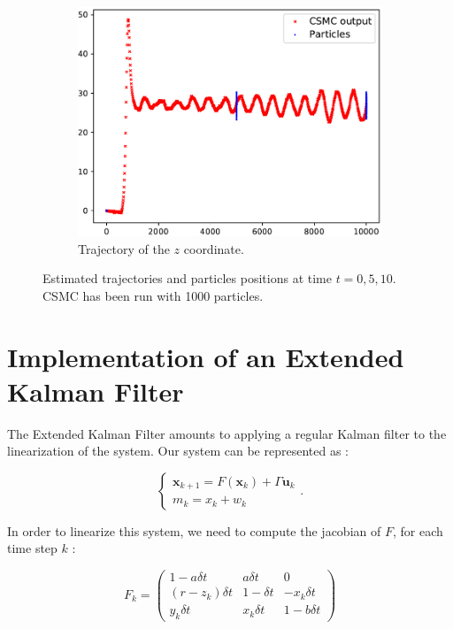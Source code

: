 \documentclass[english, DIV=13]{scrartcl}
\renewcommand{\vec}[1]{\mathbf{#1}}
\begin{document}
\begin{figure}
\begin{subfigure}{0.49\textwidth}
        \includegraphics[width=\textwidth]{figures/z-trajectory-data}
        \caption{Trajectory of the $z$ coordinate.} 
        \label{fig:z-trajectory-data}
    \end{subfigure}
    \caption{Estimated trajectories and particles positions at time $t=0, 5, 10$.
    CSMC has been run with 1000 particles.}
\end{figure}

\FloatBarrier

\section{Implementation of an Extended Kalman Filter}

The Extended Kalman Filter amounts to applying a regular Kalman filter to the linearization of the system. Our system can be represented as :


\begin{equation*}
    \begin{cases}
        \vec{x}_{k+1} = F(\vec{x}_k) + \Gamma\vec{u}_k \\
        m_k = x_k + w_k
    \end{cases}.
\end{equation*}

In order to linearize this system, we need to compute the jacobian of $F$, for each time step $k$ :

\begin{equation*}
F_k = 
    \begin{pmatrix}
        1 - a \delta t & a \delta t & 0 \\
        (r - z_k) \delta t & 1 - \delta t & - x_k \delta t \\
        y_k \delta t & x_k \delta t & 1 - b \delta t
    \end{pmatrix}
\end{equation*}
\end{document}
